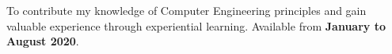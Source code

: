 

\begin{cvvols}
{\paragraphstyle \justify To contribute my knowledge of Computer Engineering principles and gain valuable experience through experiential learning. Available from \textbf{January to August 2020}.}
\end{cvvols}
